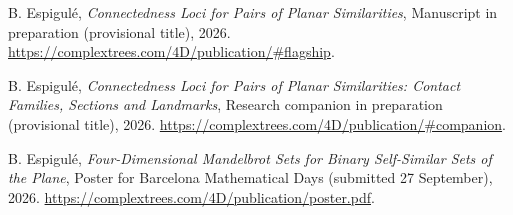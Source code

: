 
B. Espigul\'e,
\emph{Connectedness Loci for Pairs of Planar Similarities},
Manuscript in preparation (provisional title), 2026.
\url{https://complextrees.com/4D/publication/#flagship}.

B. Espigul\'e,
\emph{Connectedness Loci for Pairs of Planar Similarities: Contact Families, Sections and Landmarks},
Research companion in preparation (provisional title), 2026.
\url{https://complextrees.com/4D/publication/#companion}.

B. Espigul\'e,
\emph{Four-Dimensional Mandelbrot Sets for Binary Self-Similar Sets of the Plane},
Poster for Barcelona Mathematical Days (submitted 27 September), 2026.
\url{https://complextrees.com/4D/publication/poster.pdf}.
